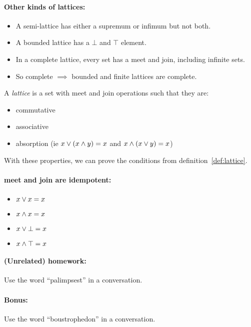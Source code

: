 \documentclass{article}
\begin{document}
\paragraph{Other kinds of lattices:}
\begin{itemize}
  \item A semi-lattice has either a supremum or infimum but not both.
  \item A bounded lattice has a $\bot$ and $\top$ element.
  \item In a complete lattice, every set has a meet and join, including
    infinite sets.
  \item So complete $\implies$ bounded and finite lattices are complete.
\end{itemize}

\begin{definition}
  A \emph{lattice} is a set with meet and join operations such that they are:
  \begin{itemize}
    \item commutative
    \item associative
    \item absorption (ie $x\vee (x\wedge y) = x$ and $x\wedge (x\vee y) = x$)
  \end{itemize}
  With these properties, we can prove the conditions from
  definition~\ref{def:lattice}.
\end{definition}

\paragraph{meet and join are idempotent:}
\begin{itemize}
  \item $x\vee x = x$
  \item $x\wedge x = x$
  \item $x\vee \bot = x$
  \item $x\wedge \top = x$
\end{itemize}

\paragraph{(Unrelated) homework: } Use the word ``palimpsest'' in a conversation.
\paragraph{Bonus:} Use the word ``boustrophedon'' in a conversation.
\end{document}
